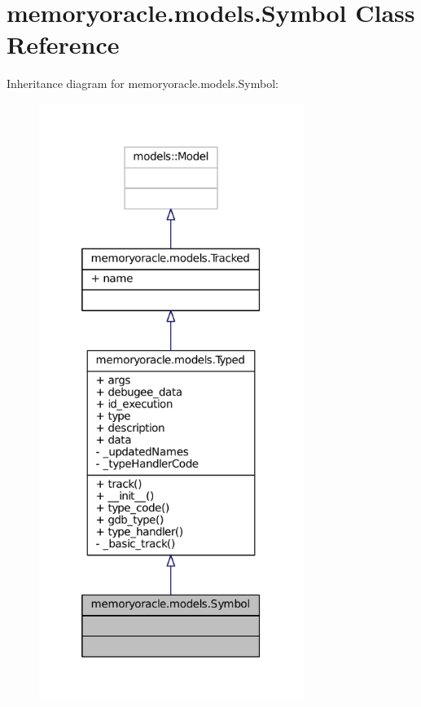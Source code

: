 \hypertarget{classmemoryoracle_1_1models_1_1Symbol}{}\section{memoryoracle.\+models.\+Symbol Class Reference}
\label{classmemoryoracle_1_1models_1_1Symbol}


Inheritance diagram for memoryoracle.\+models.\+Symbol\+:\nopagebreak
\begin{figure}[H]
\begin{center}
\leavevmode
\includegraphics[height=550pt]{classmemoryoracle_1_1models_1_1Symbol__inherit__graph}
\end{center}
\end{figure}


